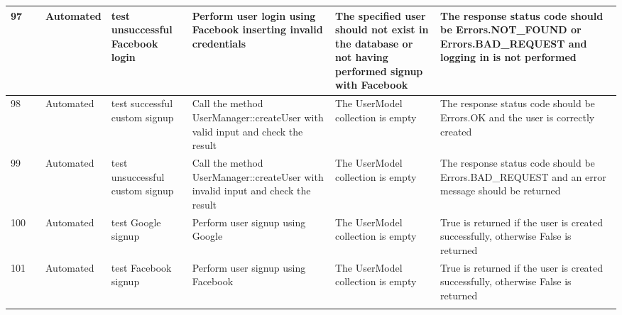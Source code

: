 \documentclass{article}
\begin{document}
{\begin{tabular}{|
      >{\columncolor[HTML]{FFFFFF}}l |
      >{\columncolor[HTML]{FFFFFF}}c |
      >{\columncolor[HTML]{FFFFFF}}l |l|l|l|l|}
    97                        & \cellcolor[HTML]{FFFFFF}                                       & {\color[HTML]{11734B} Automated} & test unsuccessful Facebook login    & Perform user login using Facebook inserting invalid credentials                     & The specified user should not exist in the database or not having performed signup with Facebook      & The response status code should be Errors.NOT\_FOUND or Errors.BAD\_REQUEST and logging in is not performed           \\ \cline{1-1} \cline{3-7}
    98                        & \cellcolor[HTML]{FFFFFF}                                       & {\color[HTML]{11734B} Automated} & test successful custom signup       & Call the method UserManager::createUser with valid input and check the result       & The UserModel collection is empty                                                                     & The response status code should be Errors.OK and the user is correctly created                                        \\ \cline{1-1} \cline{3-7}
    99                        & \cellcolor[HTML]{FFFFFF}                                       & {\color[HTML]{11734B} Automated} & test unsuccessful custom signup     & Call the method UserManager::createUser with invalid input and check the result     & The UserModel collection is empty                                                                     & The response status code should be Errors.BAD\_REQUEST and an error message should be returned                        \\ \cline{1-1} \cline{3-7}
    100                       & \cellcolor[HTML]{FFFFFF}                                       & {\color[HTML]{11734B} Automated} & test Google signup                  & Perform user signup using Google                                                    & The UserModel collection is empty                                                                     & True is returned if the user is created successfully, otherwise False is returned                                     \\ \cline{1-1} \cline{3-7}
    101                       & \cellcolor[HTML]{FFFFFF}                                       & {\color[HTML]{11734B} Automated} & test Facebook signup                & Perform user signup using Facebook                                                  & The UserModel collection is empty                                                                     & True is returned if the user is created successfully, otherwise False is returned                                     \\ \cline{1-1} \cline{3-7}

\end{tabular}}
\end{document}
